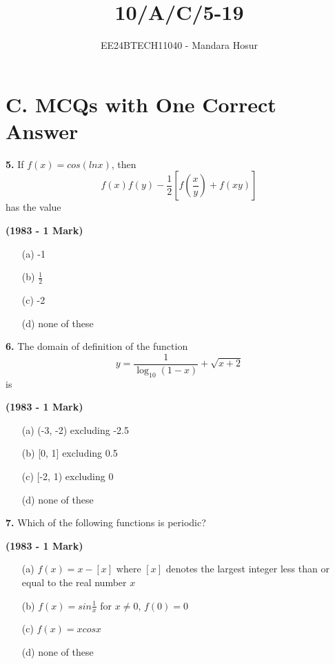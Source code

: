 \documentclass[journal,12pt,twocolumn]{IEEEtran}
\theoremstyle{remark}
\begin{document}

\vspace{3cm}

\title{10/A/C/5-19}
\author{EE24BTECH11040 - Mandara Hosur}
\maketitle
\newpage
\bigskip

\renewcommand{\thefigure}{\theenumi}
\renewcommand{\thetable}{\theenumi}

\section*{\textbf{C. MCQs with One Correct Answer}}

\textbf{5.} If $f(x) = cos(ln x)$, then $$f(x)f(y)-\frac{1}{2} \left[f\left(\frac{x}{y}\right)+f(xy)\right]$$ has the value

\hfill{\textbf{(1983 - 1 Mark)}}

\begin{enumerate}
\item[(a)] -1 
\item[(b)] $\frac{1}{2}$
\item[(c)] -2
\item[(d)] none of these
\end{enumerate}

\textbf{6.} The domain of definition of the function
$$y = \frac{1}{\log_{10}{(1-x)}} + \sqrt{x+2}$$ is

\hfill{\textbf{(1983 - 1 Mark)}}

\begin{enumerate}
\item[(a)] (-3, -2) excluding -2.5
\item[(b)] [0, 1] excluding 0.5
\item[(c)] [-2, 1) excluding 0
\item[(d)] none of these
\end{enumerate}

\textbf{7.} Which of the following functions is periodic?

\hfill{\textbf{(1983 - 1 Mark)}}

\begin{enumerate}
\item[(a)] $f(x)=x-\left[x\right]$ where $\left[x\right]$ denotes the largest integer less than or equal to the real number $x$
\item[(b)] $f(x)=sin\frac{1}{x}$ for $x\neq0$, $f(0)=0$
\item[(c)] $f(x)=xcosx$
\item[(d)] none of these
\end{enumerate}
\end{document}
